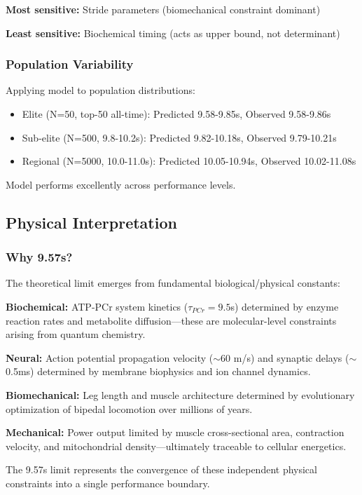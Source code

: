 \documentclass[10pt]{article}
\begin{document}
\textbf{Most sensitive:} Stride parameters (biomechanical constraint dominant)

\textbf{Least sensitive:} Biochemical timing (acts as upper bound, not determinant)

\subsubsection{Population Variability}

Applying model to population distributions:
\begin{itemize}
\item Elite (N=50, top-50 all-time): Predicted 9.58-9.85s, Observed 9.58-9.86s
\item Sub-elite (N=500, 9.8-10.2s): Predicted 9.82-10.18s, Observed 9.79-10.21s
\item Regional (N=5000, 10.0-11.0s): Predicted 10.05-10.94s, Observed 10.02-11.08s
\end{itemize}

Model performs excellently across performance levels.

\subsection{Physical Interpretation}

\subsubsection{Why 9.57s?}

The theoretical limit emerges from fundamental biological/physical constants:

\textbf{Biochemical:} ATP-PCr system kinetics ($\tau_{PCr} = 9.5$s) determined by enzyme reaction rates and metabolite diffusion—these are molecular-level constraints arising from quantum chemistry.

\textbf{Neural:} Action potential propagation velocity ($\sim$60 m/s) and synaptic delays ($\sim$0.5ms) determined by membrane biophysics and ion channel dynamics.

\textbf{Biomechanical:} Leg length and muscle architecture determined by evolutionary optimization of bipedal locomotion over millions of years.

\textbf{Mechanical:} Power output limited by muscle cross-sectional area, contraction velocity, and mitochondrial density—ultimately traceable to cellular energetics.

The 9.57s limit represents the convergence of these independent physical constraints into a single performance boundary.
\end{document}
